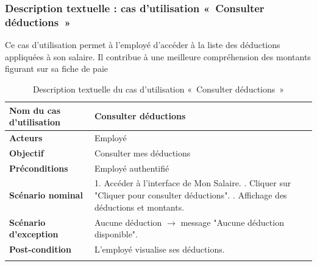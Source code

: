 \subsubsection*{Description textuelle : cas d'utilisation «~Consulter déductions~»}
Ce cas d'utilisation permet à l'employé d'accéder à la liste des déductions appliquées à son salaire. Il contribue à une meilleure compréhension des montants figurant sur sa fiche de paie
\begin{center}
\begin{longtable}{|p{5cm}|p{9cm}|}
\hline
\textbf{Nom du cas d'utilisation} & Consulter déductions \\ \hline
\textbf{Acteurs} & Employé \\ \hline
\textbf{Objectif} & Consulter mes déductions \\ \hline
\textbf{Préconditions} & Employé authentifié \\ \hline
\textbf{Scénario nominal} &
1. Accéder à l'interface de Mon Salaire. \newline
2. Cliquer sur "Cliquer pour consulter déductions". \newline
3. Affichage des déductions et montants. \\ \hline
\textbf{Scénario d'exception} & Aucune déduction $\rightarrow$ message "Aucune déduction disponible". \\ \hline
\textbf{Post-condition} & L'employé visualise ses déductions. \\ \hline
\caption{Description textuelle du cas d'utilisation «~Consulter déductions~»}
\end{longtable}
\end{center}

